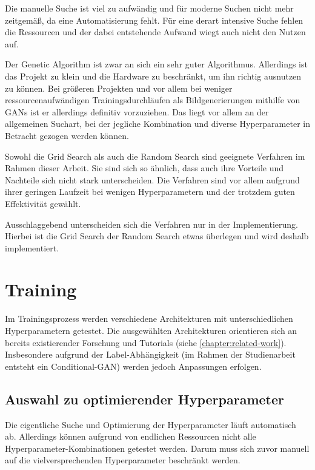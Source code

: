Die manuelle Suche ist viel zu aufwändig und für moderne Suchen nicht mehr zeitgemäß, da eine Automatisierung fehlt.
Für eine derart intensive Suche fehlen die Ressourcen und der dabei entstehende Aufwand wiegt auch nicht den Nutzen auf.
\newline

Der Genetic Algorithm ist zwar an sich ein sehr guter Algorithmus.
Allerdings ist das Projekt zu klein und die Hardware zu beschränkt, um ihn richtig ausnutzen zu können.
Bei größeren Projekten und vor allem bei weniger ressourcenaufwändigen Trainingsdurchläufen als Bildgenerierungen mithilfe von GANs ist er allerdings definitiv vorzuziehen.
Das liegt vor allem an der allgemeinen Suchart, bei der jegliche Kombination und diverse Hyperparameter in Betracht gezogen werden können.
\newline

Sowohl die Grid Search als auch die Random Search sind geeignete Verfahren im Rahmen dieser Arbeit.
Sie sind sich so ähnlich, dass auch ihre Vorteile und Nachteile sich nicht stark unterscheiden.
Die Verfahren sind vor allem aufgrund ihrer geringen Laufzeit bei wenigen Hyperparametern und der trotzdem guten Effektivität gewählt.

Ausschlaggebend unterscheiden sich die Verfahren nur in der Implementierung.
Hierbei ist die Grid Search der Random Search etwas überlegen und wird deshalb implementiert.

\section{Training}
Im Trainingsprozess werden verschiedene Architekturen mit unterschiedlichen Hyperparametern getestet.
Die ausgewählten Architekturen orientieren sich an bereits existierender Forschung und Tutorials (siehe \cref{chapter:related-work}).
Insbesondere aufgrund der Label-Abhängigkeit (im Rahmen der Studienarbeit entsteht ein Conditional-GAN) werden jedoch Anpassungen erfolgen.


\subsection{Auswahl zu optimierender Hyperparameter}
Die eigentliche Suche und Optimierung der Hyperparameter läuft automatisch ab.
Allerdings können aufgrund von endlichen Ressourcen nicht alle Hyperparameter-Kombinationen getestet werden.
Darum muss sich zuvor manuell auf die vielversprechenden Hyperparameter beschränkt werden.
\newline

